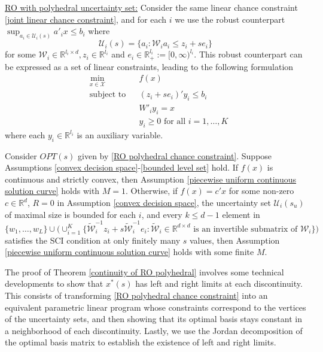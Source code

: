 \documentclass[mnsc,blindrev]{informs4} %
\newcommand{\R}{\mathbb{R}}
\begin{document}
\noindent\underline{RO with polyhedral uncertainty set:}
Consider the same linear chance constraint \eqref{joint linear chance constraint}, and for each $i$ we use the robust counterpart $\sup_{a_i\in\mathcal U_i(s)}a'_ix\leq b_i$ where
\begin{equation*}
\mathcal U_i(s)=\{a_i:\mathcal W_ia_i\leq z_i+se_i\}
\end{equation*}
for some $\mathcal W_i\in \R^{l_i\times d},z_i\in\R^{l_i}$ and $e_i\in\R_+^{l_i}:=[0,\infty)^{l_i}$. This robust counterpart can be expressed as a set of linear constraints, leading to the following formulation
\begin{equation}\label{RO polyhedral chance constraint}
\begin{aligned}
    &\min_{x\in\mathcal X}&&f(x)\\
    &\text{subject to}&&(z_i+se_i)'y_i\leq b_i\\
    &&&W'_iy_i=x\\
    &&&y_i\geq 0\text{\ \  for all }i=1,\ldots,K
\end{aligned}
\end{equation}
where each $y_i\in\R^{l_i}$ is an auxiliary variable.

\begin{theorem}\label{continuity of RO polyhedral}
Consider $OPT(s)$ given by \eqref{RO polyhedral chance constraint}. Suppose Assumptions \ref{convex decision space}-\ref{bounded level set} hold. If $f(x)$ is continuous and strictly convex, then Assumption \ref{piecewise uniform continuous solution curve} holds with $M=1$. Otherwise, if $f(x)=c'x$ for some non-zero $c\in\R^d$, $R=0$ in Assumption \ref{convex decision space}, the uncertainty set $\mathcal U_i(s_u)$ of maximal size is bounded for each $i$, and every $k\leq d-1$ element in $\{w_1,\ldots,w_L\}\cup\big( \cup_{i=1}^K\{\widetilde{\mathcal W}_i^{-1}z_i+s\widetilde{\mathcal W}_i^{-1}e_i:\widetilde{\mathcal W}_i\in\R^{d\times d}\text{ is an invertible submatrix of }\mathcal W_i\}\big)$ satisfies the SCI condition at only finitely many $s$ values, then Assumption \ref{piecewise uniform continuous solution curve} holds with some finite $M$.
\end{theorem}
The proof of Theorem \ref{continuity of RO polyhedral} involves some technical developments to show that $x^*(s)$ has left and right limits at each discontinuity. This consists of transforming \eqref{RO polyhedral chance constraint} into an equivalent parametric linear program whose constraints correspond to the vertices of the uncertainty sets, and then showing that its optimal basis stays constant in a neighborhood of each discontinuity. Lastly, we use the Jordan decomposition of the optimal basis matrix to establish the existence of left and right limits.
\end{document}
